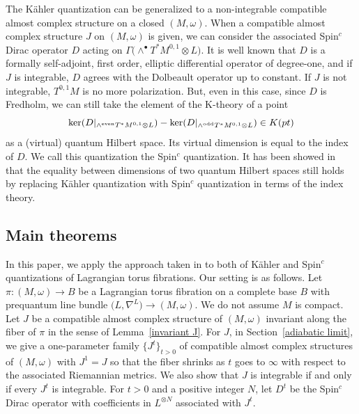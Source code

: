 \documentclass[10pt,a4paper]{amsart}
\numberwithin{equation}{section}
\begin{document}
The K\"ahler quantization can be generalized to a non-integrable compatible almost complex structure on a closed $(M,\omega)$. When a compatible almost complex structure $J$ on $(M,\omega)$ is given, we can consider the associated Spin${}^c$ Dirac operator $D$ acting on $\Gamma \bigl(\wedge^\bullet T^*M^{0,1}\otimes L\bigr)$. It is well known that $D$ is a formally self-adjoint, first order, elliptic differential operator of degree-one, and if $J$ is integrable, $D$ agrees with the Dolbeault operator up to constant. If $J$ is not integrable, $T^{0,1}M$ is no more polarization. But, even in this case, since $D$ is Fredholm, we can still take the element of the K-theory of a point
\[%
\ker ( D|_{\wedge^{\rm even}T^*M^{0,1}\otimes L}) -\ker ( D|_{\wedge^{\rm odd}T^*M^{0,1}\otimes L}) \in K(pt)
\]
as a (virtual) quantum Hilbert space. Its virtual dimension is equal to the index of $D$. We call this quantization the Spin${}^c$ quantization. It has been showed in~\cite{Andersen, FFY1,Kubota} that the equality between dimensions of two quantum Hilbert spaces still holds by replacing K\"ahler quantization with Spin${}^c$ quantization in terms of the index theory.

\subsection{Main theorems}
In this paper, we apply the approach taken in \cite{BFMN} to both of K\"ahler and Spin${}^c$ quantizations of Lagrangian torus fibrations. Our setting is as follows. Let $\pi\colon (M,\omega)\to B$ be a Lagrangian torus fibration on a complete base $B$ with prequantum line bundle $\bigl(L,\nabla^L\bigr)\to (M,\omega)$. We do not assume $M$ is compact. Let $J$ be
a compatible almost complex structure of $(M,\omega)$ invariant along the fiber of $\pi$ in the sense of Lemma~\ref{invariant J}. For $J$, in Section~\ref{adiabatic limit}, we give a one-parameter family $\big\{ J^t\big\}_{t>0}$ of compatible almost complex structures of $(M,\omega)$ with $J^1=J$ so that the fiber shrinks as $t$ goes to $\infty$ with respect to the associated Riemannian metrics. We also show that $J$ is integrable if and only if every $J^t$ is integrable. For $t>0$ and a positive integer $N$, let $D^t$ be the Spin${}^c$ Dirac operator with coefficients in $L^{\otimes N}$ associated with $J^t$.
\end{document}
